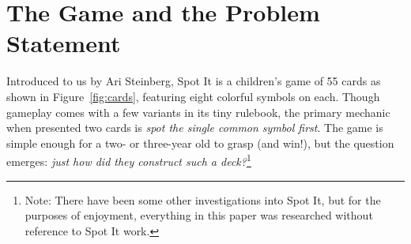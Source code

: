\documentclass[11pt, oneside]{article} 	%
\begin{document}
\section{The Game and the Problem Statement}

Introduced to us by Ari Steinberg, Spot It is a children's game of 55 cards as shown in Figure~\ref{fig:cards}, featuring eight colorful symbols on each. Though gameplay comes with a few variants in its tiny rulebook, the primary mechanic when presented two cards is \emph{spot the single common symbol first}. The game is simple enough for a two- or three-year old to grasp (and win!), but the question emerges: \emph{just how did they construct such a deck?}\footnote{Note: There have been some other investigations into Spot It\cite{2}, but for the purposes of enjoyment, everything in this paper was researched without reference to Spot It work.}
\end{document}
